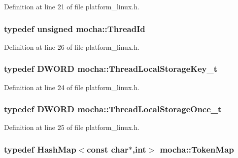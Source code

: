 Definition at line 21 of file platform\_\-linux.h.

\hypertarget{namespacemocha_a9fcf48a10671a66cd922f7e21d6efb6b}{
\subsubsection[{ThreadId}]{\setlength{\rightskip}{0pt plus 5cm}typedef unsigned {\bf mocha::ThreadId}}}
\label{namespacemocha_a9fcf48a10671a66cd922f7e21d6efb6b}


Definition at line 26 of file platform\_\-linux.h.

\hypertarget{namespacemocha_a47a856b5a5c202b2292502aaaaadce75}{
\subsubsection[{ThreadLocalStorageKey\_\-t}]{\setlength{\rightskip}{0pt plus 5cm}typedef DWORD {\bf mocha::ThreadLocalStorageKey\_\-t}}}
\label{namespacemocha_a47a856b5a5c202b2292502aaaaadce75}


Definition at line 24 of file platform\_\-linux.h.

\hypertarget{namespacemocha_ada647d8e6d9802c8b822352d3f257e15}{
\subsubsection[{ThreadLocalStorageOnce\_\-t}]{\setlength{\rightskip}{0pt plus 5cm}typedef DWORD {\bf mocha::ThreadLocalStorageOnce\_\-t}}}
\label{namespacemocha_ada647d8e6d9802c8b822352d3f257e15}


Definition at line 25 of file platform\_\-linux.h.

\hypertarget{namespacemocha_af3bb64b09dae0d96af52cb20d13d79a4}{
\subsubsection[{TokenMap}]{\setlength{\rightskip}{0pt plus 5cm}typedef {\bf HashMap}$<$const char$\ast$,int$>$ {\bf mocha::TokenMap}}}
\label{namespacemocha_af3bb64b09dae0d96af52cb20d13d79a4}



